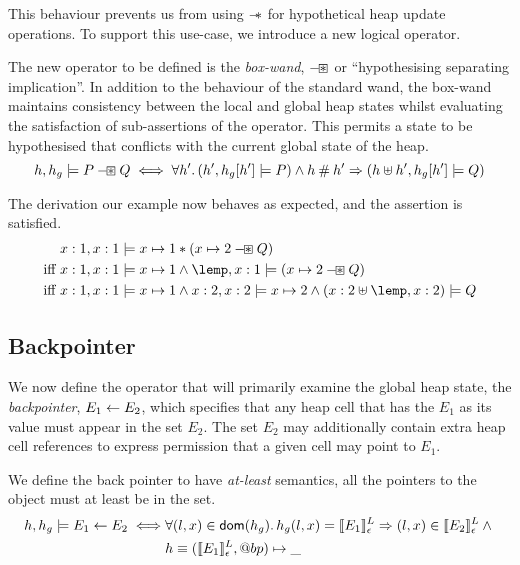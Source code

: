 \documentclass[a4paper,notitlepage]{report}
\begin{document}
This behaviour prevents us from using $\mathbin{-\mkern-6mu *}$ for hypothetical heap update
operations. To support this use-case, we introduce a new logical operator.

The new operator to be defined is the \emph{box-wand}, $\mathbin{-\mkern-3mu \boxast}$ or
``hypothesising separating implication''. In addition
to the behaviour of the standard wand, the box-wand maintains consistency
between the local and global heap states whilst evaluating the satisfaction of
sub-assertions of the operator. This permits a state to be hypothesised that
conflicts with the current global state of the heap.
\[
  h,h_g \models P \mathbin{-\mkern-3mu \boxast} Q \iff \forall h' \mathpunct{.} (h',h_g[h'] \models P)
  \land h \mathbin{\#} h' \Rightarrow (h \uplus h', h_g[h'] \models Q)
\]

The derivation our example now behaves as expected, and the assertion is
satisfied.
\begin{align*}
           & x:1,x:1 \satisfies x \pointsto 1 \sep (x \pointsto 2 \boxwand Q) \\
\text{iff } & x:1,x:1 \satisfies x \pointsto 1 \land \lemp,x:1 \satisfies (x \pointsto 2 \boxwand Q) \\
\text{iff } & x:1,x:1 \satisfies x \pointsto 1 \land x:2,x:2 \satisfies x \pointsto 2 \land (x:2 \disju \lemp,x:2) \satisfies Q
\end{align*}


\subsection{Backpointer}
We now define the operator that will primarily examine the global heap state,
the \emph{backpointer}, $E_1 \leftarrow E_2$, which
specifies that any heap cell that has the $E_1$ as its value must appear in the
set $E_2$. The set $E_2$ may additionally contain extra heap cell references to
express permission that a given cell may point to $E_1$.

We define the back pointer to have \emph{at-least} semantics, all the pointers
to the object must at least be in the set.
\begin{align*}
  h, h_g \models E_1 \leftarrow E_2 \iff &
    \forall (l,x) \in \mathsf{dom}(h_g) \mathpunct{.} h_g(l,x) = \llbracket E_1 \rrbracket^L_\epsilon
    \Rightarrow (l,x) \in \llbracket E_2 \rrbracket^L_\epsilon \land {} \\
    & h \equiv (\llbracket E_1 \rrbracket^L_\epsilon, @bp) \mapsto \_
\end{align*}
\end{document}
